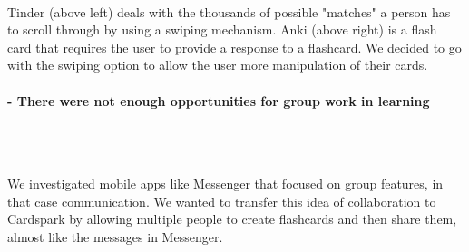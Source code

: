 \documentclass{article}
\begin{document}
	\\Tinder (above left) deals with the thousands of possible "matches" a person has to scroll through by using a swiping mechanism. Anki (above right) is a flash card that requires the user to provide a response to a flashcard.  We decided to go with the swiping option to allow the user more manipulation of their cards.
\newpage

\paragraph{\textbf{- There were not enough opportunities for group work in learning}}
	\mbox{}\\
	\begin{figure}[!ht]
	  \centering
	\end{figure}
	\\We investigated mobile apps like Messenger that focused on group features, in that case communication.  We wanted to transfer this idea of collaboration to Cardspark by allowing multiple people to create flashcards and then share them, almost like the messages in Messenger.

\vspace{5mm}
\end{document}
